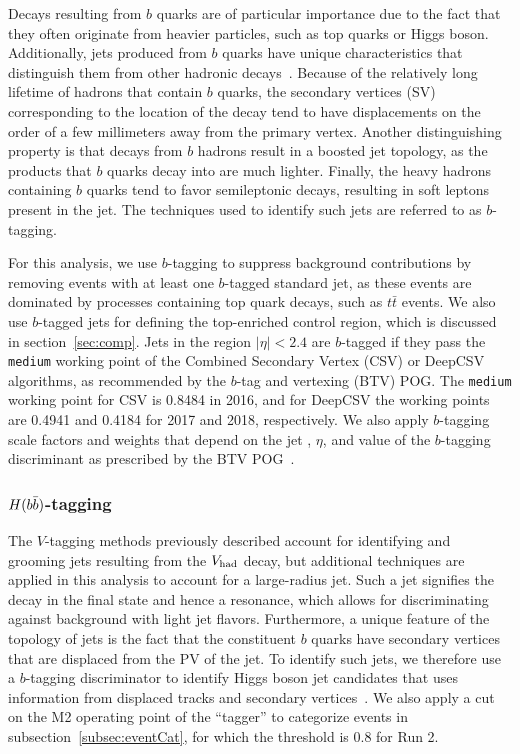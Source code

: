 Decays resulting from $b$ quarks are of particular importance due to the fact that they often originate from heavier particles, such as top quarks or Higgs boson.
Additionally, jets produced from $b$ quarks have unique characteristics that distinguish them from other hadronic decays~\cite{Sirunyan_jet}.
Because of the relatively long lifetime of hadrons that contain $b$ quarks, the secondary vertices (SV) corresponding to the location of the decay tend to have displacements on the order of a few millimeters away from the primary vertex.
Another distinguishing property is that decays from $b$ hadrons result in a boosted jet topology, as the products that $b$ quarks decay into are much lighter.
Finally, the heavy hadrons containing $b$ quarks tend to favor semileptonic decays, resulting in soft leptons present in the jet.
The techniques used to identify such jets are referred to as $b$-tagging.

For this analysis, we use $b$-tagging to suppress background contributions by removing events with at least one $b$-tagged standard jet, as these events are dominated by processes containing top quark decays, such as $t\bar{t}$ events.
We also use $b$-tagged jets for defining the top-enriched control region, which is discussed in section~\ref{sec:comp}.
Jets in the region $|\eta|<2.4$ are $b$-tagged if they pass the \texttt{medium} working point of the Combined Secondary Vertex (CSV) or DeepCSV algorithms, as recommended by the $b$-tag and vertexing (BTV) POG.
The \texttt{medium} working point for CSV is 0.8484 in 2016, and for DeepCSV the working points are 0.4941 and 0.4184 for 2017 and 2018, respectively. %
We also apply $b$-tagging scale factors and weights that depend on the jet \pt, $\eta$, and value of the $b$-tagging discriminant as prescribed by the BTV POG~\cite{bTaggingEff,bTaggingSF}.

\subsubsection{$H(b\bar{b})$-tagging}

The $V$-tagging methods previously described account for identifying and grooming jets resulting from the $V_\mathrm{had}$ decay, but additional techniques are applied in this analysis to account for a large-radius \bbbar jet.
Such a jet signifies the decay \Htobbbar in the final state and hence a \WH resonance, which allows for discriminating against background with light jet flavors.
Furthermore, a unique feature of the topology of \bbbar jets is the fact that the constituent $b$ quarks have secondary vertices that are displaced from the PV of the jet.
To identify such \bbbar jets, we therefore use a $b$-tagging discriminator to identify Higgs boson jet candidates that uses information from displaced tracks and secondary vertices~\cite{CMS-PAS-BTV-15-002}.
We also apply a cut on the M2 operating point of the ``\DoubleB tagger'' to categorize events in subsection~\ref{subsec:eventCat}, for which the threshold is 0.8 for Run 2. %

